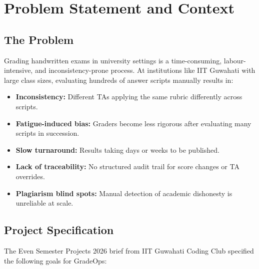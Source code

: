 \documentclass[12pt,a4paper]{article}
\begin{document}
\tableofcontents
\newpage

\section{Problem Statement and Context}

\subsection{The Problem}

Grading handwritten exams in university settings is a time-consuming, labour-intensive, and inconsistency-prone process. At institutions like IIT Guwahati with large class sizes, evaluating hundreds of answer scripts manually results in:

\begin{itemize}[leftmargin=*, noitemsep]
  \item \textbf{Inconsistency:} Different TAs applying the same rubric differently across scripts.
  \item \textbf{Fatigue-induced bias:} Graders become less rigorous after evaluating many scripts in succession.
  \item \textbf{Slow turnaround:} Results taking days or weeks to be published.
  \item \textbf{Lack of traceability:} No structured audit trail for score changes or TA overrides.
  \item \textbf{Plagiarism blind spots:} Manual detection of academic dishonesty is unreliable at scale.
\end{itemize}

\subsection{Project Specification}

The Even Semester Projects 2026 brief from IIT Guwahati Coding Club specified the following goals for GradeOps:
\end{document}
